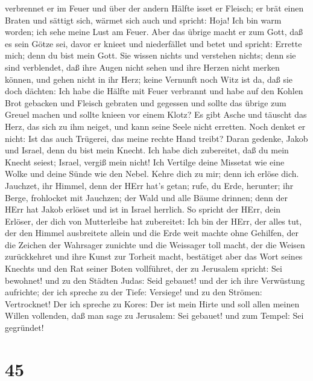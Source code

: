 verbrennet er im Feuer und über der andern Hälfte isset er Fleisch; er
brät einen Braten und sättigt sich, wärmet sich auch und spricht: Hoja!
Ich bin warm worden; ich sehe meine Lust am Feuer.  Aber
das übrige macht er zum Gott, daß es sein Götze sei, davor er knieet und
niederfället und betet und spricht: Errette mich; denn du bist mein
Gott.  Sie wissen nichts und verstehen nichts; denn sie
sind verblendet, daß ihre Augen nicht sehen und ihre Herzen nicht merken
können,  und gehen nicht in ihr Herz; keine Vernunft noch
Witz ist da, daß sie doch dächten: Ich habe die Hälfte mit Feuer
verbrannt und habe auf den Kohlen Brot gebacken und Fleisch gebraten und
gegessen und sollte das übrige zum Greuel machen und sollte knieen vor
einem Klotz?  Es gibt Asche und täuscht das Herz, das sich
zu ihm neiget, und kann seine Seele nicht erretten. Noch denket er
nicht: Ist das auch Trügerei, das meine rechte Hand treibt?
 Daran gedenke, Jakob und Israel, denn du bist mein Knecht.
Ich habe dich zubereitet, daß du mein Knecht seiest; Israel, vergiß mein
nicht!  Ich Vertilge deine Missetat wie eine Wolke und
deine Sünde wie den Nebel. Kehre dich zu mir; denn ich erlöse dich.
 Jauchzet, ihr Himmel, denn der HErr hat's getan; rufe, du
Erde, herunter; ihr Berge, frohlocket mit Jauchzen; der Wald und alle
Bäume drinnen; denn der HErr hat Jakob erlöset und ist in Israel
herrlich.  So spricht der HErr, dein Erlöser, der dich von
Mutterleibe hat zubereitet: Ich bin der HErr, der alles tut, der den
Himmel ausbreitete allein und die Erde weit machte ohne Gehilfen,
 der die Zeichen der Wahrsager zunichte und die Weissager
toll macht, der die Weisen zurückkehret und ihre Kunst zur Torheit
macht,  bestätiget aber das Wort seines Knechts und den Rat
seiner Boten vollführet, der zu Jerusalem spricht: Sei bewohnet! und zu
den Städten Judas: Seid gebauet! und der ich ihre Verwüstung aufrichte;
 der ich spreche zu der Tiefe: Versiege! und zu den
Strömen: Vertrocknet!  Der ich spreche zu Kores: Der ist
mein Hirte und soll allen meinen Willen vollenden, daß man sage zu
Jerusalem: Sei gebauet! und zum Tempel: Sei gegründet!

\hypertarget{section-44}{%
\section{45}\label{section-44}}


